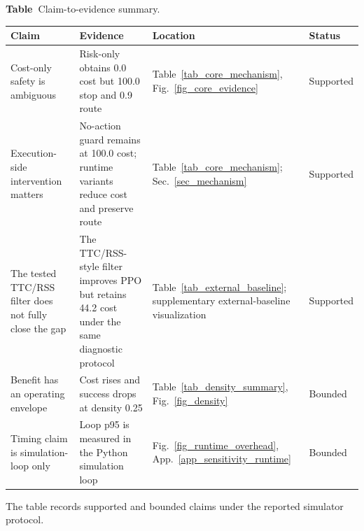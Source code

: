 
\begin{center}
\label{tab_claim_evidence}
\footnotesize
\textbf{Table~\thetable}\quad Claim-to-evidence summary.\par
\vspace{3pt}
\setlength{\tabcolsep}{3.4pt}
\renewcommand{\arraystretch}{1.08}
\begin{tabular}{@{}>{\raggedright\arraybackslash}p{}>{\raggedright\arraybackslash}p{}>{\raggedright\arraybackslash}p{}>{\raggedright\arraybackslash}p{}@{}}
\toprule
Claim & Evidence & Location & Status \\
\midrule
Cost-only safety is ambiguous & Risk-only obtains 0.0 cost but 100.0 stop and 0.9 route & Table~\ref{tab_core_mechanism}, Fig.~\ref{fig_core_evidence} & Supported \\
Execution-side intervention matters & No-action guard remains at 100.0 cost; runtime variants reduce cost and preserve route & Table~\ref{tab_core_mechanism}; Sec.~\ref{sec_mechanism} & Supported \\
The tested TTC/RSS filter does not fully close the gap & The TTC/RSS-style filter improves PPO but retains 44.2 cost under the same diagnostic protocol & Table~\ref{tab_external_baseline}; supplementary external-baseline visualization & Supported \\
Benefit has an operating envelope & Cost rises and success drops at density 0.25 & Table~\ref{tab_density_summary}, Fig.~\ref{fig_density} & Bounded \\
Timing claim is simulation-loop only & Loop p95 is measured in the Python simulation loop & Fig.~\ref{fig_runtime_overhead}, App.~\ref{app_sensitivity_runtime} & Bounded \\
\bottomrule
\end{tabular}
\par\vspace{2pt}
\begin{minipage}{0.86\textwidth}
\footnotesize The table records supported and bounded claims under the reported simulator protocol.
\end{minipage}
\end{center}
